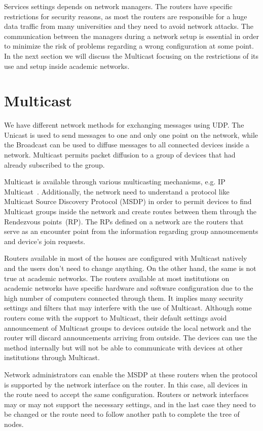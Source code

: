 Services settings depends on network managers.
The routers have specific restrictions for security reasons, as most the routers are responsible for a huge data traffic from many universities and they need to avoid network attacks.
The communication between the managers during a network setup is essential in order to minimize the risk of problems regarding a wrong configuration at some point.
In the next section we will discuss the Multicast focusing on the restrictions of its use and setup inside academic networks.

\section{Multicast}
\label{sec:multicast}

We have different network methods for exchanging messages using UDP.
The Unicast is used to send messages to one and only one point on the network, while the Broadcast can be used to diffuse messages to all connected devices inside a network.  
Multicast permits packet diffusion to a group of devices that had already subscribed to the group.

Multicast is available through various multicasting mechanisms, e.g. IP Multicast~\citep{Diot2000ipmulticast}.
Additionally, the network need to understand a protocol like Multicast Source Discovery Protocol (MSDP) in order to permit devices to find Multicast groups inside the network and create routes between them through the Rendezvous points~(RP).
The RPs defined on a network are the routers that serve as an encounter point from the information regarding group announcements and device's join requests.

Routers available in most of the houses are configured with Multicast natively and the users don't need to change anything.
On the other hand, the same is not true at academic networks.
The routers available at most institutions on academic networks have specific hardware and software configuration due to the high number of computers connected through them.
It implies many security settings and filters that may interfere with the use of Multicast.
Although some routers come with the support to Multicast, their default settings avoid announcement of Multicast groups to devices outside the local network and the router will discard announcements arriving from outside.
The devices can use the method internally but will not be able to communicate with devices at other institutions through Multicast.

Network administrators can enable the MSDP at these routers when the protocol is supported by the network interface on the router.
In this case, all devices in the route need to accept the same configuration.
Routers or network interfaces may or may not support the necessary settings, and in the last case they need to be changed or the route need to follow another path to complete the tree of nodes.    

